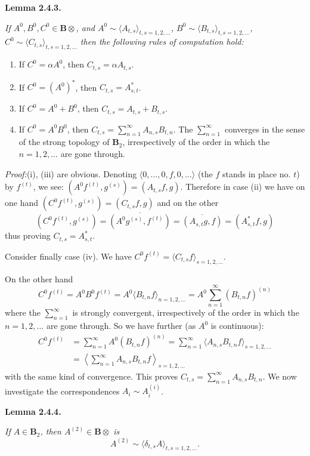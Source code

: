 \documentclass[12pt,b5paper,twoside]{article}
\newcommand{\B}{\mathbf B}
\newcommand{\Lemma}[1]{%
  \par\smallskip\noindent\phantomsection\label{lem:#1}\textbf{Lemma #1.}\enspace
}
\newcommand{\Proof}{\par\noindent\textit{Proof:}\enspace}
\begin{document}
\Lemma{2.4.3}
{\itshape
If $A^0,B^0,C^0\in\B\otimes$, and
$A^0\sim\langle A_{t,s}\rangle_{t,s=1,2,\ldots}$,
$B^0\sim\langle B_{t,s}\rangle_{t,s=1,2,\ldots}$,
$C^0\sim\langle C_{t,s}\rangle_{t,s=1,2,\ldots}$ then the following rules of
computation hold:
\begin{enumerate}[label=(\roman*)]
\item If $C^0=\alpha A^0$, then $C_{t,s}=\alpha A_{t,s}$.
\item If $C^0=(A^0)^*$, then $C_{t,s}=A_{s,t}^*$.
\item If $C^0=A^0+B^0$, then $C_{t,s}=A_{t,s}+B_{t,s}$.
\item If $C^0=A^0B^0$, then
  $C_{t,s}=\sum_{n=1}^{\infty}A_{n,s}B_{t,n}$. The
  $\sum_{n=1}^{\infty}$ converges in the sense of the strong topology of
  $\B_2$, irrespectively of the order in which the $n=1,2,\ldots$ are gone
  through.
\end{enumerate}}

\Proof (i), (iii) are obvious. Denoting
$\langle0,\ldots,0,f,0,\ldots\rangle$ (the $f$ stands in place no. $t$) by
$f^{(t)}$, we see: $(A^0f^{(t)},g^{(s)})=(A_{t,s}f,g)$. Therefore in case
(ii) we have on one hand $(C^0f^{(t)},g^{(s)})=(C_{t,s}f,g)$ and on the
other
\[
 (C^0f^{(t)},g^{(s)})
 =\overline{(A^0g^{(s)},f^{(t)})}
 =\overline{(A_{s,t}g,f)}=(A_{s,t}^*f,g)
\]
thus proving $C_{t,s}=A_{s,t}^*$.

Consider finally case (iv). We have
$C^0f^{(t)}=\langle C_{t,s}f\rangle_{s=1,2,\ldots}$.

On the other hand
\[
 C^0f^{(t)}=A^0B^0f^{(t)}
 =A^0\langle B_{t,n}f\rangle_{n=1,2,\ldots}
 =A^0\sum_{n=1}^{\infty}(B_{t,n}f)^{(n)}
\]
where the $\sum_{n=1}^{\infty}$ is strongly convergent, irrespectively of the
order in which the $n=1,2,\ldots$ are gone through. So we have further (as
$A^0$ is continuous):
\begin{align*}
 C^0f^{(t)}
 &=\sum_{n=1}^{\infty}A^0(B_{t,n}f)^{(n)}
  =\sum_{n=1}^{\infty}
       \langle A_{n,s}B_{t,n}f\rangle_{s=1,2,\ldots}\\
 &=\left\langle\sum_{n=1}^{\infty}A_{n,s}B_{t,n}f
   \right\rangle_{s=1,2,\ldots}
\end{align*}
with the same kind of convergence. This proves
$C_{t,s}=\sum_{n=1}^{\infty}A_{n,s}B_{t,n}$. We now investigate the
correspondences $A_i\sim A_i^{(i)}$.

\Lemma{2.4.4}
{\itshape
If $A\in\B_2$, then $A^{(2)}\in\B\otimes$ is
\[
 A^{(2)}\sim\langle\delta_{t,s}A\rangle_{t,s=1,2,\ldots}.
\]}
\end{document}
